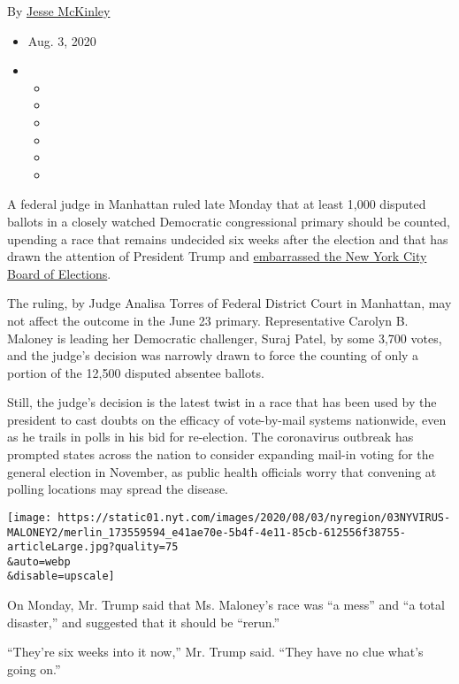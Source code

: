 By \href{https://www.nytimes.com/by/jesse-mckinley}{Jesse McKinley}

\begin{itemize}
\item
  Aug. 3, 2020
\item
  \begin{itemize}
  \item
  \item
  \item
  \item
  \item
  \item
  \end{itemize}
\end{itemize}

A federal judge in Manhattan ruled late Monday that at least 1,000
disputed ballots in a closely watched Democratic congressional primary
should be counted, upending a race that remains undecided six weeks
after the election and that has drawn the attention of President Trump
and
\href{https://www.nytimes.com/2020/08/03/nyregion/nyc-mail-ballots-voting.html}{embarrassed
the New York City Board of Elections}.

The ruling, by Judge Analisa Torres of Federal District Court in
Manhattan, may not affect the outcome in the June 23 primary.
Representative Carolyn B. Maloney is leading her Democratic challenger,
Suraj Patel, by some 3,700 votes, and the judge's decision was narrowly
drawn to force the counting of only a portion of the 12,500 disputed
absentee ballots.

Still, the judge's decision is the latest twist in a race that has been
used by the president to cast doubts on the efficacy of vote-by-mail
systems nationwide, even as he trails in polls in his bid for
re-election. The coronavirus outbreak has prompted states across the
nation to consider expanding mail-in voting for the general election in
November, as public health officials worry that convening at polling
locations may spread the disease.

\texttt{[image: https://static01.nyt.com/images/2020/08/03/nyregion/03NYVIRUS-MALONEY2/merlin\_173559594\_e41ae70e-5b4f-4e11-85cb-612556f38755-articleLarge.jpg?quality=75\\\&auto=webp\\\&disable=upscale]}

On Monday, Mr. Trump said that Ms. Maloney's race was ``a mess'' and ``a
total disaster,'' and suggested that it should be ``rerun.''

``They're six weeks into it now,'' Mr. Trump said. ``They have no clue
what's going on.''

